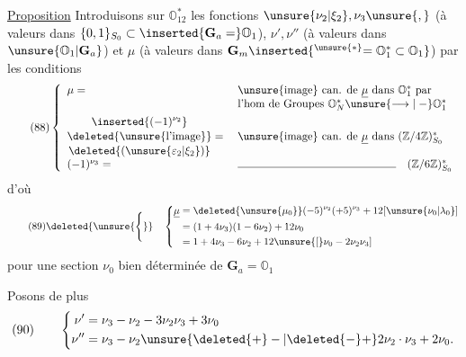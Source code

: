 \uline{Proposition} Introduisons sur  $\mathbb O_{12}^*$ les fonctions \inserted{$\underline{\mu}\mapsto$} $\unsure{\nu_2|\xi_2},\nu_3\unsure{,}$  (à valeurs dans $\{0,1\}_{S_0}\subset\inserted{\mathbf G_a=}\mathbb O_1$), $\nu',\nu''$  (à valeurs dans $\unsure{\mathbb O_1|\mathbf G_a}$) et $\mu$ (à valeurs dans $\mathbf G_m\inserted{^{\unsure{*}}=\mathbb O_1^*\subset\mathbb O_1}$)  par les conditions
\[
\tag{88}
\left\{\begin{array}{ll}
\mu={}&\text{\unsure{image} can. de }\underline{\mu}\text{ dans }\mathbb O_1^*\text{ par}\\
&\text{l'hom de Groupes }\mathbb O_N^*\unsure{\longrightarrow|\mathrel{-}}\mathbb O_1^*\\[4pt]
\begin{gathered}
\inserted{(-1)^{\nu_2}}\\[-2pt]
\deleted{\text{\unsure{l'image}}}\\[-2pt]
\deleted{(\unsure{\varepsilon_2|\xi_2})}
\end{gathered}={}&\text{\unsure{image} can. de }\underline{\mu}\text{ dans }(\mathbb Z/4\mathbb Z)^*_{S_0}\\[4pt]
(-1)^{\nu_3}={}&\rule{5cm}{0.4pt}\quad(\mathbb Z/6\mathbb Z)^*_{S_0}
\end{array}\right.
\]
d'où
\[
\tag{89}
\deleted{\unsure{\Bigg\{}}\quad
\left\{\begin{aligned}
\underline{\mu}&=\deleted{\unsure{\mu_0}}(-5)^{\nu_2}(+5)^{\nu_3}+12[\unsure{\nu_0|\lambda_0}]\\
&=(1+4\nu_3)(1-6\nu_2)+12\nu_0\\
&=1+4\nu_3-6\nu_2+12\unsure{[}\nu_0-2\nu_2\nu_3]
\end{aligned}\right.
\]
pour une section $\nu_0$ bien déterminée de $\mathbf G_a=\mathbb O_1$


Posons de plus
\[
(90)\qquad
\left\{\begin{aligned}
\nu'&=\nu_3-\nu_2-3\nu_2\nu_3+3\nu_0\\
\nu''&=\nu_3-\nu_2\unsure{\deleted{+}-|\deleted{-}+}2\nu_2\cdot\nu_3+2\nu_0.
\end{aligned}\right.
\]

